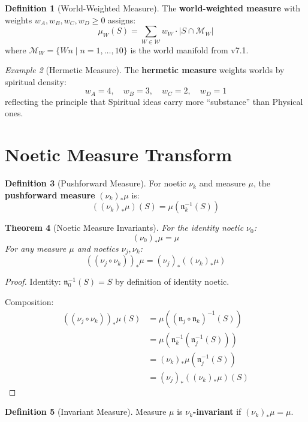 \documentclass[11pt,twoside,openright]{book}
\theoremstyle{definition}
\newtheorem{definition}{Definition}[chapter]
\theoremstyle{plain}
\newtheorem{theorem}[definition]{Theorem}
\theoremstyle{remark}
\newtheorem{example}[definition]{Example}
\newcommand{\Worlds}{\mathcal{W}}
\newcommand{\noe}[1]{\nu_{#1}}
\begin{document}
\begin{definition}[World-Weighted Measure]
\label{def:world-weighted}
The \textbf{world-weighted measure} with weights $w_A, w_B, w_C, w_D \geq 0$ assigns:
\[
\mu_W(S) = \sum_{W \in \Worlds} w_W \cdot |S \cap \mathcal{M}_W|
\]
where $\mathcal{M}_W = \{Wn \mid n = 1, \ldots, 10\}$ is the world manifold from v7.1.
\end{definition}

\begin{example}[Hermetic Measure]
\label{ex:hermetic-measure}
The \textbf{hermetic measure} weights worlds by spiritual density:
\[
w_A = 4, \quad w_B = 3, \quad w_C = 2, \quad w_D = 1
\]
reflecting the principle that Spiritual ideas carry more ``substance'' than Physical ones.
\end{example}

\section{Noetic Measure Transform}

\begin{definition}[Pushforward Measure]
\label{def:pushforward}
For noetic $\noe{k}$ and measure $\mu$, the \textbf{pushforward measure} $(\noe{k})_* \mu$ is:
\[
((\noe{k})_* \mu)(S) = \mu(\mathfrak{n}_k^{-1}(S))
\]
\end{definition}

\begin{theorem}[Noetic Measure Invariants]
\label{thm:noetic-measure-invariant}
For the identity noetic $\noe{0}$:
\[
(\noe{0})_* \mu = \mu
\]
For any measure $\mu$ and noetics $\noe{j}, \noe{k}$:
\[
((\noe{j} \circ \noe{k}))_* \mu = (\noe{j})_* ((\noe{k})_* \mu)
\]
\end{theorem}

\begin{proof}
Identity: $\mathfrak{n}_0^{-1}(S) = S$ by definition of identity noetic.

Composition:
\begin{align}
((\noe{j} \circ \noe{k}))_* \mu(S) &= \mu((\mathfrak{n}_j \circ \mathfrak{n}_k)^{-1}(S)) \\
&= \mu(\mathfrak{n}_k^{-1}(\mathfrak{n}_j^{-1}(S))) \\
&= (\noe{k})_* \mu(\mathfrak{n}_j^{-1}(S)) \\
&= (\noe{j})_* ((\noe{k})_* \mu)(S)
\end{align}
\end{proof}

\begin{definition}[Invariant Measure]
\label{def:invariant-measure}
Measure $\mu$ is \textbf{$\noe{k}$-invariant} if $(\noe{k})_* \mu = \mu$.
\end{definition}
\end{document}
